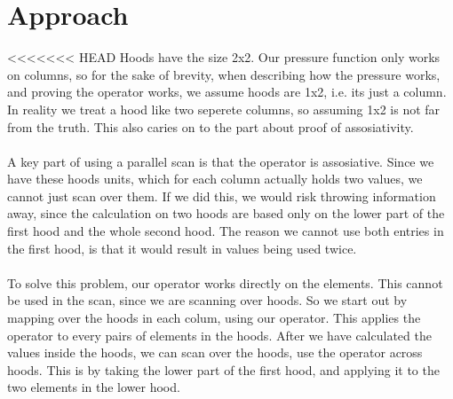 \documentclass[11pt]{report}
\begin{document}
\section{Approach}
<<<<<<< HEAD
Hoods have the size 2x2. Our pressure function only works on columns, so for the sake of brevity, when describing how the pressure works, and proving the operator works, we assume hoods are 1x2, i.e. its just a column. In reality we treat a hood like two seperete columns, so assuming 1x2 is not far from the truth. This also caries on to the part about proof of assosiativity.
\\
\\
A key part of using a parallel scan is that the operator is assosiative. Since we have these hoods units, which for each column actually holds two values, we cannot just scan over them. If we did this, we would risk throwing information away, since the calculation on two hoods are based only on the lower part of the first hood and the whole second hood. The reason we cannot use both entries in the first hood, is that it would result in values being used twice.
\\
\\
To solve this problem, our operator works directly on the elements. This cannot be used in the scan, since we are scanning over hoods. So we start out by mapping over the hoods in each colum, using our operator. This applies the operator to every pairs of elements in the hoods. After we have calculated the values inside the hoods, we can scan over the hoods, use the operator across hoods. This is by taking the lower part of the first hood, and applying it to the two elements in the lower hood.
\\
\end{document}

